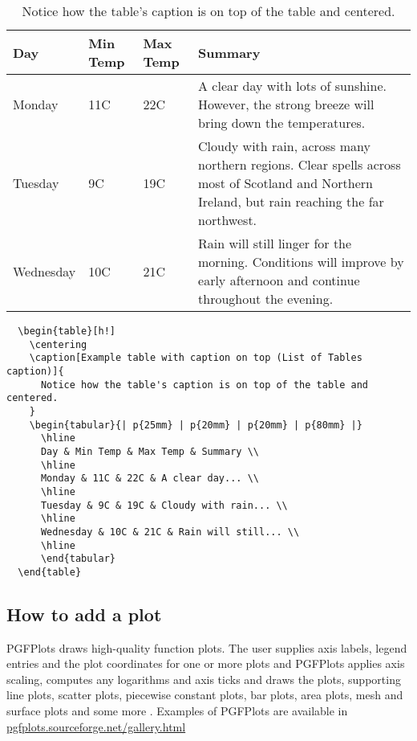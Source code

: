 \begin{table}[h!]
  \centering
  \caption[Example table with caption on top (List of Tables caption)]{
    Notice how the table's caption is on top of the table and centered.
  }
  \begin{tabular}{| p{25mm} | p{20mm} | p{20mm} | p{80mm} |}
    \hline
    Day & Min Temp & Max Temp & Summary \\
    \hline
    Monday & 11C & 22C & A clear day with lots of sunshine.
    However, the strong breeze will bring down the temperatures. \\
    \hline
    Tuesday & 9C & 19C & Cloudy with rain, across many northern regions.
    Clear spells across most of Scotland and Northern Ireland,
    but rain reaching the far northwest. \\
    \hline
    Wednesday & 10C & 21C & Rain will still linger for the morning.
    Conditions will improve by early afternoon and continue
    throughout the evening. \\
    \hline
    \end{tabular}
\end{table}

\begin{verbatim}
  \begin{table}[h!]
    \centering
    \caption[Example table with caption on top (List of Tables caption)]{
      Notice how the table's caption is on top of the table and centered.
    }
    \begin{tabular}{| p{25mm} | p{20mm} | p{20mm} | p{80mm} |}
      \hline
      Day & Min Temp & Max Temp & Summary \\
      \hline
      Monday & 11C & 22C & A clear day... \\
      \hline
      Tuesday & 9C & 19C & Cloudy with rain... \\
      \hline
      Wednesday & 10C & 21C & Rain will still... \\
      \hline
      \end{tabular}
  \end{table}
\end{verbatim}

\subsection{How to add a plot}
PGFPlots draws high-quality function plots.
The user supplies axis labels, legend entries and the plot coordinates for
one or more plots and PGFPlots applies axis scaling, computes any logarithms
and axis ticks and draws the plots, supporting line plots, scatter plots,
piece­wise constant plots, bar plots, area plots, mesh and surface plots and
some more \cite{pgfplots}.
%
Examples of PGFPlots are available in
\href{http://pgfplots.sourceforge.net/gallery.html}
     {pgfplots.sourceforge.net/gallery.html}

